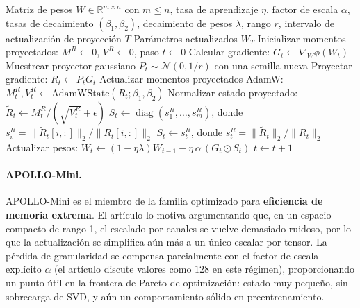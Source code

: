 \documentclass[11pt,a4paper]{article}
\begin{document}
\begin{algorithm}[H]
\caption{APOLLO / APOLLO-Mini Escalado de Gradiente Estructurado}
\label{alg:apollo-family}
\begin{algorithmic}[1]
\Require Matriz de pesos $W \in \mathbb{R}^{m \times n}$ con $m \le n$, tasa de aprendizaje $\eta$, factor de escala $\alpha$, tasas de decaimiento $(\beta_1, \beta_2)$, decaimiento de pesos $\lambda$, rango $r$, intervalo de actualización de proyección $T$
\Ensure Parámetros actualizados $W_T$
\State Inicializar momentos proyectados: $M^R \gets 0$, $V^R \gets 0$, paso $t \gets 0$
\Repeat
    \State Calcular gradiente: $G_t \gets \nabla_W \phi(W_t)$
        \State Muestrear proyector gaussiano $P_t \sim \mathcal{N}(0, 1/r)$ con una semilla nueva
    \EndIf
    \State Proyectar gradiente: $R_t \gets P_t G_t$ 
    \State Actualizar momentos proyectados AdamW: $M_t^R, V_t^R \gets \text{AdamWState}(R_t; \beta_1, \beta_2)$
    \State Normalizar estado proyectado: $\widetilde{R}_t \gets M_t^R / (\sqrt{V_t^R}+\epsilon)$
        \State $S_t \gets \operatorname{diag}(s_1^R, \ldots, s_m^R)$, donde $s_i^R = \|\widetilde{R}_t[i,:]\|_2 / \|R_t[i,:]\|_2$
    \Else
        \State $S_t \gets s_t^R$, donde $s_t^R = \|\widetilde{R}_t\|_2 / \|R_t\|_2$
    \EndIf
    \State Actualizar pesos: $W_t \gets (1-\eta\lambda)W_{t-1} - \eta\,\alpha\,(G_t \odot S_t)$
    \State $t \gets t+1$
\end{algorithmic}
\end{algorithm}

\paragraph{APOLLO-Mini.}
APOLLO-Mini es el miembro de la familia optimizado para \textbf{eficiencia de memoria extrema}. El artículo lo motiva argumentando que, en un espacio compacto de rango 1, el escalado por canales se vuelve demasiado ruidoso, por lo que la actualización se simplifica aún más a un único escalar por tensor. La pérdida de granularidad se compensa parcialmente con el factor de escala explícito $\alpha$ (el artículo discute valores como $128$ en este régimen), proporcionando un punto útil en la frontera de Pareto de optimización: estado muy pequeño, sin sobrecarga de SVD, y aún un comportamiento sólido en preentrenamiento.
\end{document}
